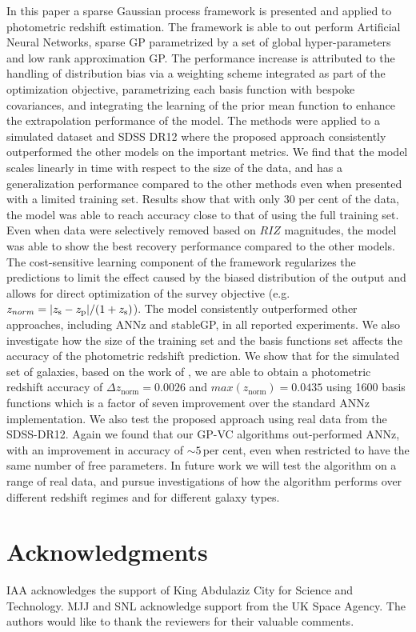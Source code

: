 \documentclass[useAMS,usenatbib,fleqn]{mn2e}
\begin{document}
In this paper a sparse Gaussian process framework is presented and applied to photometric redshift estimation. The framework is able to out perform Artificial Neural Networks, sparse GP parametrized by a set of global hyper-parameters and low rank approximation GP. The performance increase is attributed to the handling of distribution bias via a weighting scheme integrated as part of the optimization objective, parametrizing each basis function with bespoke covariances, and integrating the learning of the prior mean function to enhance the extrapolation performance of the model. The methods were applied to a simulated dataset and SDSS DR12 where the proposed approach consistently outperformed the other models on the important metrics. We find that the model scales linearly in time with respect to the size of the data, and has a generalization performance compared to the other methods even when presented with a limited training set. Results show that with only 30 per cent of the data, the model was able to reach accuracy close to that of using the full training set. Even when data were selectively removed based on $RIZ$ magnitudes, the model was able to show the best recovery performance compared to the other models. The cost-sensitive learning component of the framework regularizes the predictions to limit the effect caused by the biased distribution of the output and allows for direct optimization of the survey objective (e.g. $z_{norm} = |z_\textrm{s} - z_\textrm{p}| / (1+z_{\rm s})$). The model consistently outperformed other approaches, including {\sc ANNz} and {\sc stableGP}, in all reported experiments. We also investigate how the size of the training set and the basis functions set affects the accuracy of the photometric redshift prediction. We show that for the simulated set of galaxies, based on the work of \citet{jouvel09}, we are able to obtain a photometric redshift accuracy of $\Delta z_\textrm{norm}  = 0.0026$ and $max\left(z_\textrm{norm}\right)=0.0435$ using 1600 basis functions which is a factor of seven improvement over the standard {\sc ANNz} implementation. We also test the proposed approach using real data from  the SDSS-DR12. Again we found that our GP-VC algorithms out-performed {\sc ANNz}, with an improvement in accuracy of $\sim 5$\,per cent, even when restricted to have the same number of free parameters. In future work we will test the algorithm on a range of real data, and pursue investigations of how the algorithm performs over different redshift regimes and for different galaxy types. 




\section*{Acknowledgments}
IAA acknowledges the support of King Abdulaziz City for Science and Technology.
MJJ and SNL acknowledge support from the UK Space Agency. The authors would like to thank the reviewers for their valuable comments.
\balance
\footnotesize{


}

\label{lastpage}
\end{document}

